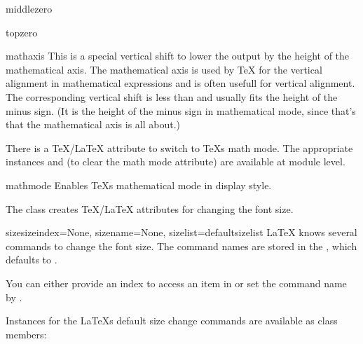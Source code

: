 \begin{memberdesc}{middlezero}
\end{memberdesc}

\begin{memberdesc}{topzero}
\end{memberdesc}

\begin{memberdesc}{mathaxis}
  This is a special vertical shift to lower the output by the height
  of the mathematical axis. The mathematical axis is used by \TeX{}
  for the vertical alignment in mathematical expressions and is often
  usefull for vertical alignment. The corresponding vertical shift is
  less than  and usually fits the height of the
  minus sign. (It is the height of the minus sign in mathematical
  mode, since that's that the mathematical axis is all about.)
\end{memberdesc}

There is a \TeX/\LaTeX{} attribute to switch to \TeX{}s math mode. The
appropriate instances  and  (to
clear the math mode attribute) are available at module level.

\begin{datadesc}{mathmode}
  Enables \TeX{}s mathematical mode in display style.
\end{datadesc}

The  class creates \TeX/\LaTeX{} attributes for changing
the font size.

\begin{classdesc}{size}{sizeindex=None, sizename=None,
                        sizelist=defaultsizelist}
  \LaTeX{} knows several commands to change the font size. The command
  names are stored in the , which defaults to
  .

  You can either provide an index  to access an item in
   or set the command name by .
\end{classdesc}

Instances for the \LaTeX{}s default size change commands are available
as class members:

